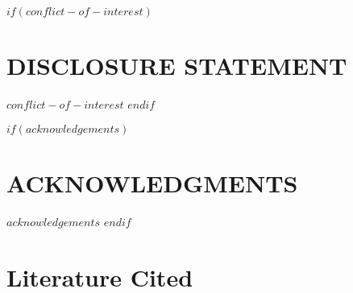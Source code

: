 $if(conflict-of-interest)$
\hypertarget{disclosure-statement}{%
\section*{DISCLOSURE STATEMENT}\label{disclosure-statement}}
$conflict-of-interest$
$endif$

$if(acknowledgements)$
\hypertarget{acknowledgments}{%
\section*{ACKNOWLEDGMENTS}\label{acknowledgments}}
$acknowledgements$
$endif$

\hypertarget{literature-cited}{%
\section*{Literature Cited}\label{literature-cited}}